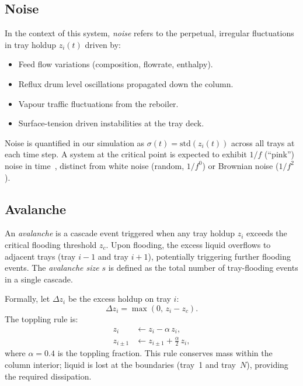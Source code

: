 \documentclass[twocolumn,12pt]{article}
\begin{document}
\subsection{Noise}

In the context of this system, \textit{noise} refers to the perpetual,
irregular fluctuations in tray holdup $z_i(t)$ driven by:

\begin{itemize}
  \item Feed flow variations (composition, flowrate, enthalpy).
  \item Reflux drum level oscillations propagated down the column.
  \item Vapour traffic fluctuations from the reboiler.
  \item Surface-tension driven instabilities at the tray deck.
\end{itemize}

Noise is quantified in our simulation as $\sigma(t) = \text{std}(z_i(t))$
across all trays at each time step.  A system at the critical point is
expected to exhibit $1/f$ (``pink'') noise in time~\cite{Bak1987},
distinct from white noise (random, $1/f^0$) or Brownian noise ($1/f^2$).

\subsection{Avalanche}

An \textit{avalanche} is a cascade event triggered when any tray holdup
$z_i$ exceeds the critical flooding threshold $z_c$.  Upon flooding, the
excess liquid overflows to adjacent trays (tray $i-1$ and tray $i+1$),
potentially triggering further flooding events.  The \textit{avalanche size}
$s$ is defined as the total number of tray-flooding events in a single cascade.

Formally, let $\Delta z_i$ be the excess holdup on tray $i$:
\begin{equation}
  \Delta z_i = \max(0,\, z_i - z_c).
\end{equation}
The toppling rule is:
\begin{align}
  z_i &\leftarrow z_i - \alpha \, z_i, \\
  z_{i \pm 1} &\leftarrow z_{i \pm 1} + \tfrac{\alpha}{2} \, z_i,
\end{align}
where $\alpha = 0.4$ is the toppling fraction.  This rule conserves
mass within the column interior; liquid is lost at the boundaries
(tray~1 and tray~$N$), providing the required dissipation.
\end{document}

